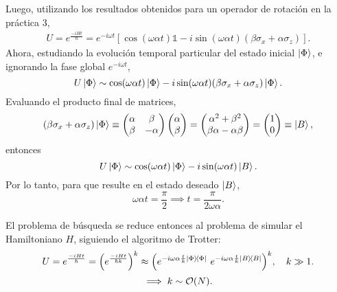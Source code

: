 \documentclass{scrartcl}
\DeclareRobustCommand{\[}{\begin{equation}}
\DeclareRobustCommand{\]}{\end{equation}}
\begin{document}
\begin{enumerate}
    Luego, utilizando los resultados obtenidos para un operador de rotación en la práctica 3,
    \begin{align}
        U = e^{\frac{-i H t}{\hbar}} = e^{-i\omega t} \left[ \cos(\omega\alpha t) \mathds{1} - i \sin(\omega\alpha t) (\beta \sigma_x + \alpha \sigma_z) \right].
    \end{align}
    Ahora, estudiando la evolución temporal particular del estado inicial $\ket{\Phi}$, e ignorando la fase global $e^{-i\omega t}$,
    \[ U \ket{\Phi} \sim \cos(\omega\alpha t) \ket{\Phi} - i \sin(\omega\alpha t) (\beta \sigma_x + \alpha \sigma_z) \ket{\Phi}. \]
    Evaluando el producto final de matrices,
    \[
        (\beta \sigma_x + \alpha \sigma_z) \ket{\Phi} \equiv
        \begin{pmatrix}
            \alpha & \beta \\
            \beta & -\alpha \\
        \end{pmatrix}
        \begin{pmatrix} \alpha \\ \beta \end{pmatrix}
        =
        \begin{pmatrix} \alpha^2 + \beta^2 \\ \beta\alpha - \alpha\beta \end{pmatrix}
        =
        \begin{pmatrix} 1 \\ 0 \end{pmatrix}
        \equiv
        \ket{B},
    \]
    entonces
    \[ U \ket{\Phi} \sim \cos(\omega\alpha t) \ket{\Phi} - i \sin(\omega\alpha t) \ket{B}. \]
    Por lo tanto, para que resulte en el estado deseado $\ket{B}$,
    \[ \omega\alpha t = \frac{\pi}{2} \implies t = \frac{\pi}{2\omega\alpha}. \]
    
    El problema de búsqueda se reduce entonces al problema de simular el Hamiltoniano $H$, siguiendo el algoritmo de Trotter:
    \[ U = e^{\frac{-iHt}{\hbar}} = \qty(e^{\frac{-iHt}{\hbar k}})^k \approx \qty(e^{-i\omega\alpha \frac{t}{k} \dyad{\Phi}{\Phi}} \ e^{-i\omega\alpha \frac{t}{k} \dyad{B}{B}})^k, \quad k \gg 1. \]
    \[ \implies k \sim \order{N}. \]
    
\end{enumerate}

\end{document}
